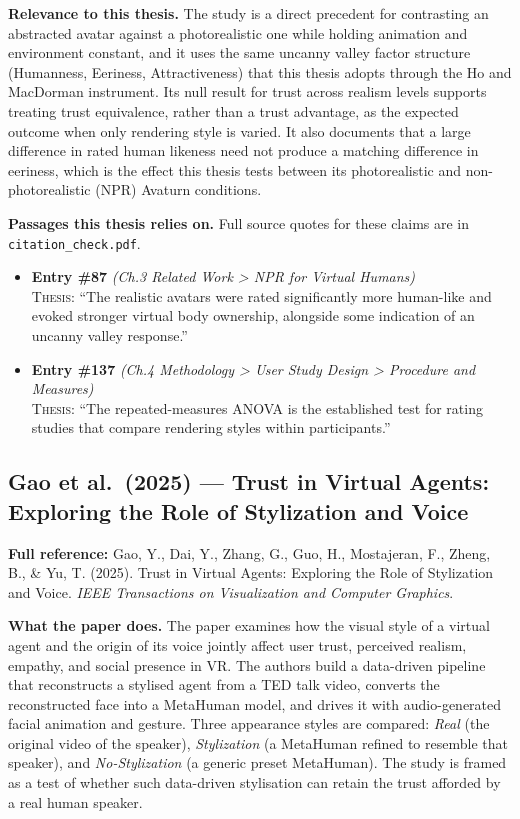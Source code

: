 \documentclass[11pt, a4paper]{article}
\begin{document}
\textbf{Relevance to this thesis.} The study is a direct precedent for contrasting an abstracted avatar against a photorealistic one while holding animation and environment constant, and it uses the same uncanny valley factor structure (Humanness, Eeriness, Attractiveness) that this thesis adopts through the Ho and MacDorman instrument. Its null result for trust across realism levels supports treating trust equivalence, rather than a trust advantage, as the expected outcome when only rendering style is varied. It also documents that a large difference in rated human likeness need not produce a matching difference in eeriness, which is the effect this thesis tests between its photorealistic and non-photorealistic (NPR) Avaturn conditions.

\vspace{8pt}


\textbf{Passages this thesis relies on.} Full source quotes for these claims are in \texttt{citation\_check.pdf}.
\begin{itemize}[leftmargin=1.2em,itemsep=4pt]
\item \textbf{Entry \#87} \textit{(Ch.3 Related Work > NPR for Virtual Humans)}\\
\textsc{Thesis:} ``The realistic avatars were rated significantly more human-like and evoked stronger virtual body ownership, alongside some indication of an uncanny valley response.''
\item \textbf{Entry \#137} \textit{(Ch.4 Methodology > User Study Design > Procedure and Measures)}\\
\textsc{Thesis:} ``The repeated-measures ANOVA is the established test for rating studies that compare rendering styles within participants.''
\end{itemize}

\subsection{Gao et al.\ (2025) --- Trust in Virtual Agents: Exploring the Role of Stylization and Voice}

\begin{refbox}
\textbf{Full reference:} Gao, Y., Dai, Y., Zhang, G., Guo, H., Mostajeran, F., Zheng, B., \& Yu, T. (2025). Trust in Virtual Agents: Exploring the Role of Stylization and Voice. \textit{IEEE Transactions on Visualization and Computer Graphics}.
\end{refbox}

\textbf{What the paper does.} The paper examines how the visual style of a virtual agent and the origin of its voice jointly affect user trust, perceived realism, empathy, and social presence in VR. The authors build a data-driven pipeline that reconstructs a stylised agent from a TED talk video, converts the reconstructed face into a MetaHuman model, and drives it with audio-generated facial animation and gesture. Three appearance styles are compared: \textit{Real} (the original video of the speaker), \textit{Stylization} (a MetaHuman refined to resemble that speaker), and \textit{No-Stylization} (a generic preset MetaHuman). The study is framed as a test of whether such data-driven stylisation can retain the trust afforded by a real human speaker.
\end{document}
